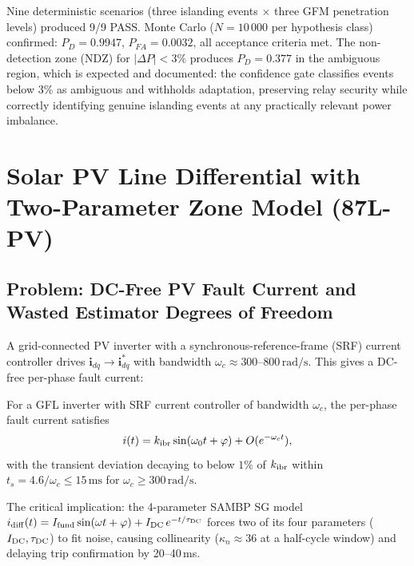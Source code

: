 Nine deterministic scenarios (three islanding events $\times$ three GFM
penetration levels) produced 9/9 PASS.
Monte Carlo ($N = 10\,000$ per hypothesis class) confirmed:
$P_D = 0.9947$, $P_{FA} = 0.0032$, all acceptance criteria met.
The non-detection zone (NDZ) for $|\Delta P| < 3\%$ produces $P_D = 0.377$
in the ambiguous region, which is expected and documented: the confidence gate
classifies events below 3\% as ambiguous and withholds adaptation, preserving
relay security while correctly identifying genuine islanding events at any
practically relevant power imbalance.

\section{Solar PV Line Differential with Two-Parameter Zone Model (87L-PV)}
\label{sec:ch6_87l_pv}

\subsection{Problem: DC-Free PV Fault Current and Wasted Estimator Degrees of Freedom}
\label{sec:ch6_pv_problem}

A grid-connected PV inverter with a synchronous-reference-frame (SRF) current
controller drives $\mathbf{i}_{dq} \to \mathbf{i}_{dq}^*$ with bandwidth
$\omega_c \approx 300$--$800\,\text{rad/s}$.  This gives a DC-free per-phase
fault current:

\begin{proposition}
\label{prop:ch6_pv_zero_dc}
For a GFL inverter with SRF current controller of bandwidth $\omega_c$, the
per-phase fault current satisfies
\begin{equation}
  i(t) = k_{\rm ibr}\sin(\omega_0 t + \varphi) + O(e^{-\omega_c t}),
  \label{eq:ch6_pv_current}
\end{equation}
with the transient deviation decaying to below $1\%$ of $k_{\rm ibr}$ within
$t_s = 4.6/\omega_c \leq 15\,\text{ms}$ for $\omega_c \geq 300\,\text{rad/s}$.
\end{proposition}

The critical implication: the 4-parameter SAMBP SG model
$i_{\rm diff}(t) = I_{\rm fund}\sin(\omega t + \varphi) + I_{\rm DC}\,e^{-t/\tau_{\rm DC}}$
forces two of its four parameters ($I_{\rm DC}, \tau_{\rm DC}$) to fit noise,
causing collinearity ($\kappa_n \approx 36$ at a half-cycle window) and
delaying trip confirmation by 20--40\,ms.

